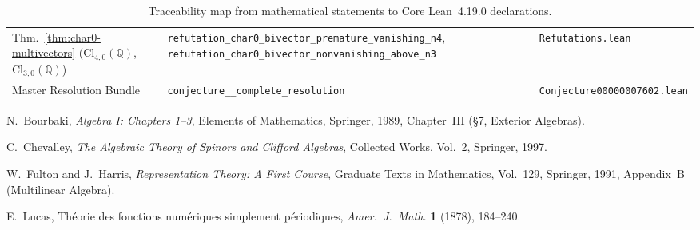 \documentclass[11pt,a4paper]{article}
\theoremstyle{definition}
\theoremstyle{remark}
\newcommand{\Cl}{\mathrm{Cl}}
\newcommand{\Q}{\mathbb{Q}}
\begin{document}
\begin{table}[ht]
\begin{tabular}{@{}>{\raggedright\arraybackslash}p{}>{\raggedright\arraybackslash}p{}>{\raggedright\arraybackslash}p{}@{}}
Thm.~\ref{thm:char0-multivectors} ($\Cl_{4,0}(\Q)$, $\Cl_{3,0}(\Q)$) & \texttt{refutation\_\allowbreak char0\_\allowbreak bivector\_\allowbreak premature\_\allowbreak vanishing\_n4}, \texttt{refutation\_\allowbreak char0\_\allowbreak bivector\_\allowbreak nonvanishing\_\allowbreak above\_n3} & \texttt{Refutations.lean} \\
Master Resolution Bundle & \texttt{conjecture\_\allowbreak 00000007602\_\allowbreak complete\_\allowbreak resolution} & \texttt{Conjecture00000007602.lean} \\
\hline
\end{tabular}
\caption{Traceability map from mathematical statements to Core Lean~4.19.0 declarations.}
\label{tab:lean-map}
\end{table}

\begin{thebibliography}{9}
N.~Bourbaki, \emph{Algebra I: Chapters 1--3}, Elements of Mathematics, Springer, 1989, Chapter~III (\S7, Exterior Algebras).

C.~Chevalley, \emph{The Algebraic Theory of Spinors and Clifford Algebras}, Collected Works, Vol.~2, Springer, 1997.

W.~Fulton and J.~Harris, \emph{Representation Theory: A First Course}, Graduate Texts in Mathematics, Vol.~129, Springer, 1991, Appendix~B (Multilinear Algebra).

E.~Lucas, Th\'eorie des fonctions num\'eriques simplement p\'eriodiques, \emph{Amer.\ J.\ Math.} \textbf{1} (1878), 184--240.
\end{thebibliography}
\end{document}
